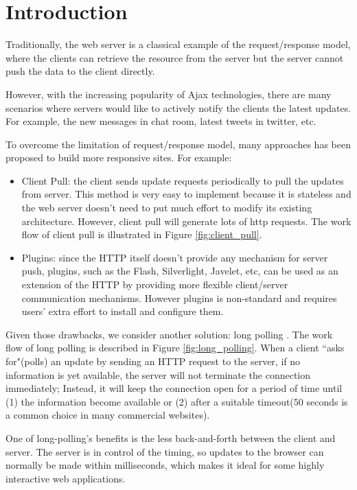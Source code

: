 \section {Introduction\\}
Traditionally, the web server is a classical example of the request/response 
model, where the clients can retrieve the resource from the server but the 
server cannot push the data to the client directly. 

However, with the increasing popularity of Ajax\cite{Ajax} technologies, there 
are many scenarios where servers would like to actively notify the clients the 
latest updates. For example, the new messages in chat room, latest tweets in 
twitter, etc.

To overcome the limitation of request/response model, many approaches has been 
proposed to build more responsive sites. For example:

\begin{itemize}
\item Client Pull: the client sends update requests periodically to pull the
updates from server. This method is very easy to implement because 
it is stateless and the web server doesn't need to put much effort to modify 
its existing architecture. However, client pull will generate lots of http requests.
The work flow of client pull is illustrated in Figure \ref{fig:client_pull}.

\item Plugins: since the HTTP itself doesn't provide any mechanism for server 
push, plugins, such as the Flash, Silverlight, Javelet, etc, can be used as an 
extension of the HTTP by providing more flexible client/server communication 
mechanisms. However plugins is non-standard and requires users' extra effort to 
install and configure them.
\end{itemize}

Given those drawbacks, we consider another solution: long polling
\cite{LongPolling}. The work flow of long polling is described in Figure
\ref{fig:long_polling}. When a client ``asks for"(polls) an update by sending 
an HTTP request to the server, if no information is yet available, the 
server will not terminate the connection immediately; Instead, it 
will keep the connection open for a period of time until (1) the information 
become available or (2) after a suitable timeout($50$ seconds is a common choice
in many commercial websites).

One of long-polling's benefits is the less back-and-forth between the 
client and server. The server is in control of the timing, so updates to the
browser can normally be made within milliseconds, which makes it ideal for 
some highly interactive web applications.

